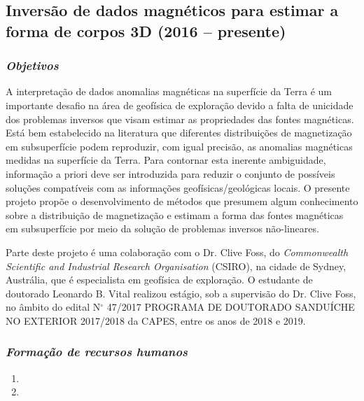 \subsection{Inversão de dados magnéticos para estimar a forma de corpos 3D (2016 -- presente)} \label{projeto-Leo}

\subsubsection{\emph{Objetivos}}

A interpretação de dados anomalias magnéticas na superfície da Terra é um importante desafio na área de geofísica de exploração devido a falta de unicidade dos problemas inversos que visam estimar as propriedades das fontes magnéticas. Está bem estabelecido na literatura que diferentes distribuições de magnetização em subsuperfície podem reproduzir, com igual precisão, as anomalias magnéticas medidas na superfície da Terra. Para contornar esta inerente ambiguidade, informação a priori deve ser introduzida para reduzir o conjunto de possíveis soluções compatíveis com as informações geofísicas/geológicas locais. O presente projeto propõe o desenvolvimento de métodos que presumem algum conhecimento sobre a distribuição de magnetização e estimam a forma das fontes magnéticas em subsuperfície por meio da solução de problemas inversos não-lineares. 

Parte deste projeto é uma colaboração com o Dr. Clive Foss, do \textit{Commonwealth
Scientific and Industrial Research Organisation} (CSIRO), na cidade de Sydney, Austrália, 
que é especialista em geofísica de exploração. O estudante de doutorado Leonardo B. Vital 
realizou estágio, sob a supervisão do Dr. Clive Foss, no âmbito do edital N$^{\circ}$ 
47/2017 PROGRAMA DE DOUTORADO SANDUÍCHE NO EXTERIOR 2017/2018 da CAPES, entre os anos 
de 2018 e 2019.

\subsubsection{\emph{Formação de recursos humanos}}

\begin{enumerate}
	
	\item{}
	
	\item{}
	
\end{enumerate}

